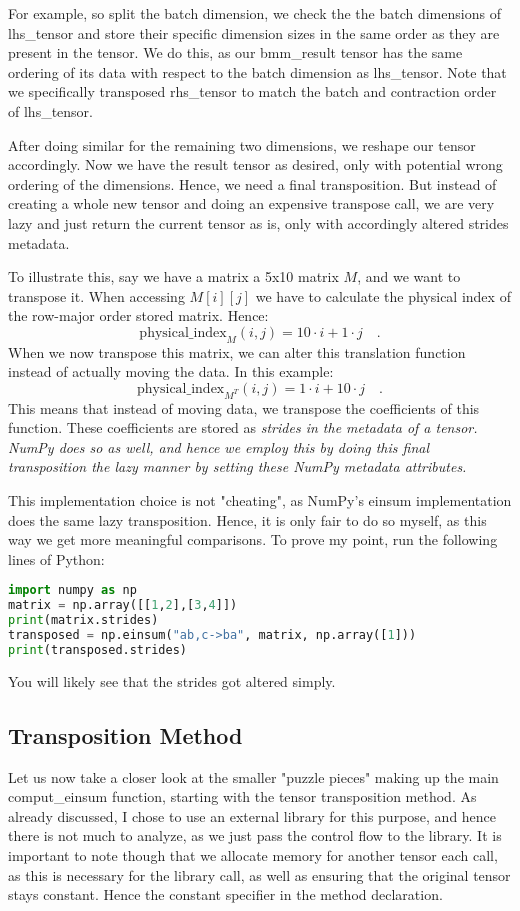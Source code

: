 \documentclass[sigconf]{acmart}
\renewcommand{\texttt}[1]{\begingroup\ttfamily\sloppy\hbadness=10000 #1\endgroup}
\begin{document}
For example, so split the batch dimension, we check the the batch dimensions of \texttt{lhs\_tensor} and store their specific dimension sizes in the same order as they are present in the tensor. We do this, as our \texttt{bmm\_result} tensor has the same ordering of its data with respect to the batch dimension as \texttt{lhs\_tensor}. Note that we specifically transposed \texttt{rhs\_tensor} to match the batch and contraction order of \texttt{lhs\_tensor}.

After doing similar for the remaining two dimensions, we reshape our tensor accordingly. Now we have the result tensor as desired, only with potential wrong ordering of the dimensions. Hence, we need a final transposition. But instead of creating a whole new tensor and doing an expensive transpose call, we are very lazy and just return the current tensor as is, only with accordingly altered strides metadata.

To illustrate this, say we have a matrix a 5x10 matrix $M$, and we want to transpose it. When accessing $M[i][j]$ we have to calculate the physical index of the row-major order stored matrix. Hence:
\[ \text{physical\_index}_M(i, j) = 10 \cdot i + 1 \cdot j \quad . \]
When we now transpose this matrix, we can alter this translation function instead of actually moving the data. In this example:
\[ \text{physical\_index}_{M^T}(i, j) = 1 \cdot i + 10 \cdot j \quad . \]
This means that instead of moving data, we transpose the coefficients of this function. These coefficients are stored as \em strides \em in the metadata of a tensor. NumPy does so as well, and hence we employ this by doing this final transposition the lazy manner by setting these NumPy metadata attributes.

This implementation choice is not "cheating", as NumPy's einsum implementation does the same lazy transposition. Hence, it is only fair to do so myself, as this way we get more meaningful comparisons. To prove my point, run the following lines of Python:
\begin{lstlisting}[language=Python]
import numpy as np
matrix = np.array([[1,2],[3,4]])
print(matrix.strides)
transposed = np.einsum("ab,c->ba", matrix, np.array([1]))
print(transposed.strides)
\end{lstlisting}
You will likely see that the strides got altered simply.


\subsection{Transposition Method}
Let us now take a closer look at the smaller "puzzle pieces" making up the main \texttt{comput\_einsum} function, starting with the tensor transposition method. As already discussed, I chose to use an external library for this purpose, and hence there is not much to analyze, as we just pass the control flow to the library. It is important to note though that we allocate memory for another tensor each call, as this is necessary for the library call, as well as ensuring that the original tensor stays constant. Hence the constant specifier in the method declaration.
\end{document}
